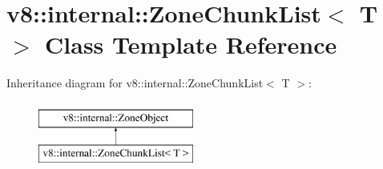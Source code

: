 \hypertarget{classv8_1_1internal_1_1ZoneChunkList}{}\section{v8\+:\+:internal\+:\+:Zone\+Chunk\+List$<$ T $>$ Class Template Reference}
\label{classv8_1_1internal_1_1ZoneChunkList}
Inheritance diagram for v8\+:\+:internal\+:\+:Zone\+Chunk\+List$<$ T $>$\+:\begin{figure}[H]
\begin{center}
\leavevmode
\includegraphics[height=2.000000cm]{classv8_1_1internal_1_1ZoneChunkList}
\end{center}
\end{figure}
